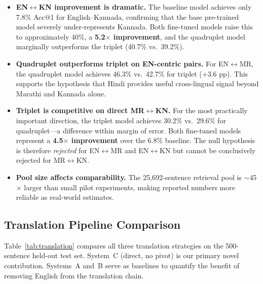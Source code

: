 \documentclass[conference,letterpaper]{IEEEtran}
\begin{document}
\begin{itemize}
    \item \textbf{EN$\leftrightarrow$KN improvement is dramatic.} The
    baseline model achieves only 7.8\% Acc@1 for English--Kannada,
    confirming that the base pre-trained model severely under-represents
    Kannada. Both fine-tuned models raise this to approximately 40\%,
    a \textbf{5.2$\times$ improvement}, and the quadruplet model
    marginally outperforms the triplet (40.7\% vs.\ 39.2\%).
    \item \textbf{Quadruplet outperforms triplet on EN-centric pairs.}
    For EN$\leftrightarrow$MR, the quadruplet model achieves 46.3\%
    vs.\ 42.7\% for triplet (+3.6 pp). This supports the hypothesis
    that Hindi provides useful cross-lingual signal beyond Marathi
    and Kannada alone.
    \item \textbf{Triplet is competitive on direct MR$\leftrightarrow$KN.}
    For the most practically important direction, the triplet model
    achieves 30.2\% vs.\ 29.6\% for quadruplet---a difference within
    margin of error. Both fine-tuned models represent a
    \textbf{4.5$\times$ improvement} over the 6.8\% baseline.
    The null hypothesis is therefore \textit{rejected} for
    EN$\leftrightarrow$MR and EN$\leftrightarrow$KN but cannot be
    conclusively rejected for MR$\leftrightarrow$KN.
    \item \textbf{Pool size affects comparability.} The 25,692-sentence
    retrieval pool is $\sim$45$\times$ larger than small pilot
    experiments, making reported numbers more reliable as real-world
    estimates.
\end{itemize}

\subsection{Translation Pipeline Comparison}
Table~\ref{tab:translation} compares all three translation strategies
on the 500-sentence held-out test set.
System~C (direct, no pivot) is our primary novel contribution.
Systems~A and~B serve as baselines to quantify
the benefit of removing English from the translation chain.
\end{document}
